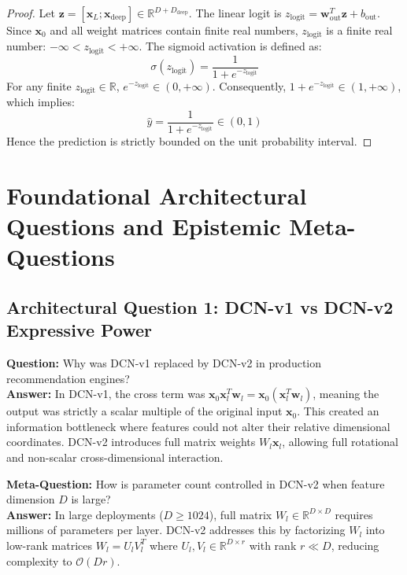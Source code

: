 \documentclass[11pt,a4paper]{article}
\theoremstyle{definition}
\begin{document}
\begin{proof}
Let $\mathbf{z} = [\mathbf{x}_L; \mathbf{x}_{\text{deep}}] \in \mathbb{R}^{D + D_{\text{deep}}}$.
The linear logit is $z_{\text{logit}} = \mathbf{w}_{\text{out}}^T \mathbf{z} + b_{\text{out}}$.
Since $\mathbf{x}_0$ and all weight matrices contain finite real numbers, $z_{\text{logit}}$ is a finite real number: $-\infty < z_{\text{logit}} < +\infty$.
The sigmoid activation is defined as:
{\boldmath
\begin{equation}
\sigma(z_{\text{logit}}) = \frac{1}{1 + e^{-z_{\text{logit}}}}
\end{equation}
}
For any finite $z_{\text{logit}} \in \mathbb{R}$, $e^{-z_{\text{logit}}} \in (0, +\infty)$.
Consequently, $1 + e^{-z_{\text{logit}}} \in (1, +\infty)$, which implies:
{\boldmath
\begin{equation}
\widehat{y} = \frac{1}{1 + e^{-z_{\text{logit}}}} \in (0, 1)
\end{equation}
}
Hence the prediction is strictly bounded on the unit probability interval.
\end{proof}

\section{Foundational Architectural Questions and Epistemic Meta-Questions}

\subsection{Architectural Question 1: DCN-v1 vs DCN-v2 Expressive Power}
\textbf{Question:} Why was DCN-v1 replaced by DCN-v2 in production recommendation engines?\\
\textbf{Answer:} In DCN-v1, the cross term was $\mathbf{x}_0 \mathbf{x}_l^T \mathbf{w}_l = \mathbf{x}_0 (\mathbf{x}_l^T \mathbf{w}_l)$, meaning the output was strictly a scalar multiple of the original input $\mathbf{x}_0$. This created an information bottleneck where features could not alter their relative dimensional coordinates. DCN-v2 introduces full matrix weights $W_l \mathbf{x}_l$, allowing full rotational and non-scalar cross-dimensional interaction.

\textbf{Meta-Question:} How is parameter count controlled in DCN-v2 when feature dimension $D$ is large?\\
\textbf{Answer:} In large deployments ($D \ge 1024$), full matrix $W_l \in \mathbb{R}^{D \times D}$ requires millions of parameters per layer. DCN-v2 addresses this by factorizing $W_l$ into low-rank matrices $W_l = U_l V_l^T$ where $U_l, V_l \in \mathbb{R}^{D \times r}$ with rank $r \ll D$, reducing complexity to $\mathcal{O}(D r)$.
\end{document}
